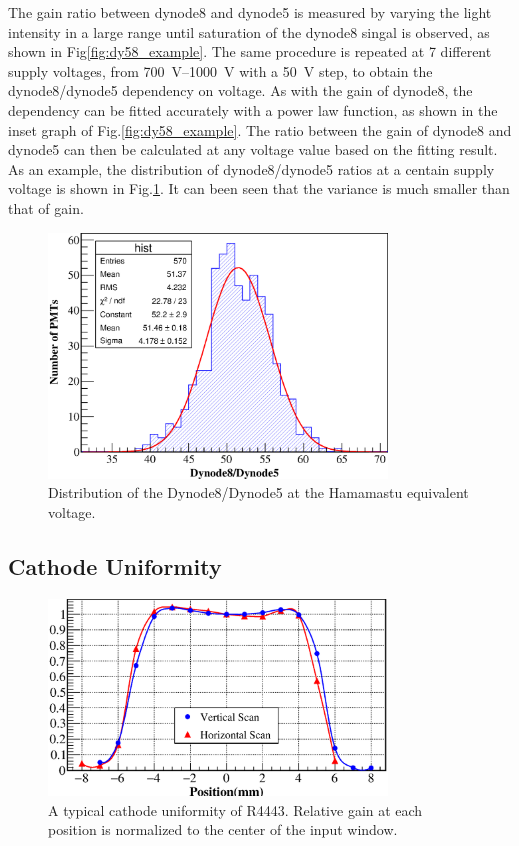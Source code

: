 \documentclass[review, times]{elsarticle}
\begin{document}
The gain ratio between dynode8 and dynode5 is measured by varying the light intensity in a large range until saturation of the dynode8 singal is observed, as shown in Fig\ref{fig:dy58_example}.
The same procedure is repeated at 7 different supply voltages, from \SIrange{700}{1000}{\volt} with a \SI{50}{\volt} step, to obtain the dynode8/dynode5 dependency on voltage.
As with the gain of dynode8, the dependency can be fitted accurately with a power law function, as shown in the inset graph of Fig.\ref{fig:dy58_example}.
The ratio between the gain of dynode8 and dynode5 can then be calculated at any voltage value based on the fitting result.
As an example, the distribution of dynode8/dynode5 ratios at a centain supply voltage is shown in Fig.\ref{fig:dy58_dist}.
It can been seen that the variance is much smaller than that of gain.

\begin{figure}
 \centering
 \includegraphics[width=90mm]{dy58_dist}
\caption{Distribution of the Dynode8/Dynode5 at the Hamamastu equivalent voltage.}
\label{fig:dy58_dist}
\end{figure} 

\subsection{Cathode Uniformity}
\label{sec:psd_cathodescan}

\begin{figure}
 \centering
 \includegraphics[width=90mm]{cathode_uniformity}
\caption{A typical cathode uniformity of R4443.
Relative gain at each position is normalized to the center of the input window.}
\label{fig:cathode_uniformity}
\end{figure} 
\end{document}
